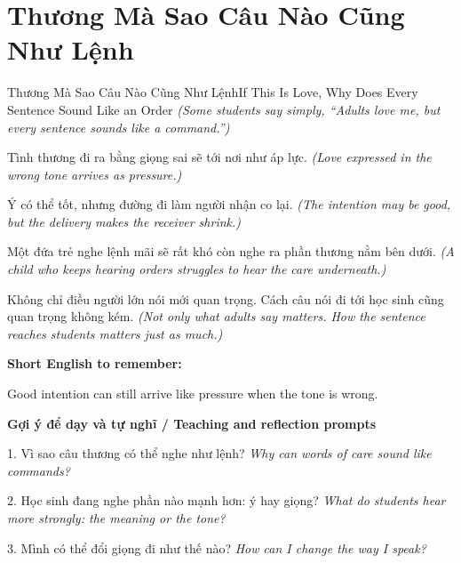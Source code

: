 \section{Thương Mà Sao Câu Nào Cũng Như Lệnh}
\begin{truyen}{Thương Mà Sao Câu Nào Cũng Như Lệnh}{If This Is Love, Why Does Every Sentence Sound Like an Order}
\textit{(Some students say simply, “Adults love me, but every sentence sounds like a command.”)}

Tình thương đi ra bằng giọng sai sẽ tới nơi như áp lực.
\textit{(Love expressed in the wrong tone arrives as pressure.)}

Ý có thể tốt, nhưng đường đi làm người nhận co lại.
\textit{(The intention may be good, but the delivery makes the receiver shrink.)}

Một đứa trẻ nghe lệnh mãi sẽ rất khó còn nghe ra phần thương nằm bên dưới.
\textit{(A child who keeps hearing orders struggles to hear the care underneath.)}

\end{truyen}

\begin{baihoc}
Không chỉ điều người lớn nói mới quan trọng. Cách câu nói đi tới học sinh cũng quan trọng không kém.
\textit{(Not only what adults say matters. How the sentence reaches students matters just as much.)}
\end{baihoc}

\begin{ghinhoanh}
\textbf{Short English to remember:}

Good intention can still arrive like pressure when the tone is wrong.

\end{ghinhoanh}

\begin{tuhocnhanh}
\textbf{Gợi ý để dạy và tự nghĩ / Teaching and reflection prompts}

1. Vì sao câu thương có thể nghe như lệnh? \textit{Why can words of care sound like commands?}

2. Học sinh đang nghe phần nào mạnh hơn: ý hay giọng? \textit{What do students hear more strongly: the meaning or the tone?}

3. Mình có thể đổi giọng đi như thế nào? \textit{How can I change the way I speak?}
\end{tuhocnhanh}
\ngancach

